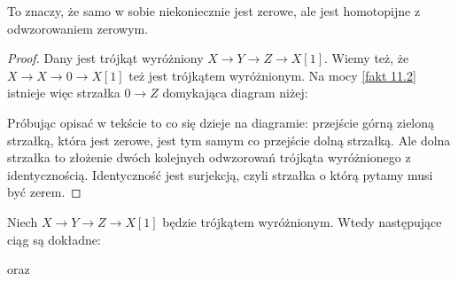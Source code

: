 To znaczy, że samo w sobie niekoniecznie jest zerowe, ale jest homotopijne z odwzorowaniem zerowym.

\begin{proof}
  Dany jest trójkąt wyróżniony $X\to Y\to Z\to X[1]$. Wiemy też, że $X\to X\to 0\to X[1]$ też jest trójkątem wyróżnionym. Na mocy \ref{fakt 11.2} istnieje więc strzałka $0\to Z$ domykająca diagram niżej:
  \begin{center}\end{center}
  Próbując opisać w tekście to co się dzieje na diagramie: przejście górną zieloną strzałką, która jest zerowe, jest tym samym co przejście dolną strzałką. Ale dolna strzałka to złożenie dwóch kolejnych odwzorowań trójkąta wyróżnionego z identycznością. Identyczność jest surjekcją, czyli strzałka o którą pytamy musi być zerem. 

\end{proof}

\begin{lemma}
  Niech $X\to Y\to Z\to X[1]$ będzie trójkątem wyróżnionym. Wtedy następujące ciąg są dokładne:
  \begin{center}\end{center}
  
  oraz

  \begin{center}\end{center}
\end{lemma}

